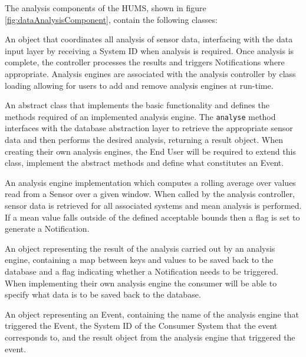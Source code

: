 \documentclass[10pt,a4paper]{article}
\begin{document}
The analysis components of the HUMS, shown in figure
\ref{fig:dataAnalysisComponent}, contain the following classes:

\begin{description}[leftmargin=1cm,labelindent=1cm]
  \item [AnalysisController] An object that coordinates all analysis of
    sensor data, interfacing with the data input layer by
    receiving a System ID when analysis is required. Once analysis is
    complete, the controller processes the results and triggers
    Notifications where appropriate. Analysis engines are associated
    with the analysis controller by class loading allowing for users to
    add and remove analysis engines at run-time.
  \vspace{0.2cm}
  \item [AnalysisEngine] An abstract class that implements the basic
    functionality and defines the methods required of an implemented
    analysis engine. The \texttt{analyse} method interfaces with the database
    abstraction layer to retrieve the appropriate sensor data and then
    performs the desired analysis, returning a result object. When creating 
    their own analysis engines, the End User will be required to extend 
    this class, implement the abstract methods and define what 
    constitutes an Event.
  \vspace{0.2cm}
  \item [MeanAnalysis] An analysis engine implementation which 
    computes a rolling average over values read from a Sensor over
    a given window. When called by the analysis controller, sensor 
    data is retrieved for all associated systems and mean analysis 
    is performed. If a mean value falls outside of the defined acceptable 
    bounds then a flag is set to generate a Notification.
  \vspace{0.2cm}
  \item [Result] An object representing the result of the analysis
    carried out by an analysis engine, containing a
    map between keys and values to be saved back to the database 
    and a flag indicating whether a Notification needs to be triggered.
    When implementing their own analysis engine the consumer will 
    be able to specify what data is to be saved back to the database.
  \vspace{0.2cm}
  \item [Event] An object representing an Event,
    containing the name of the analysis engine that triggered the
    Event, the System ID of the Consumer System that the event corresponds
    to, and the result object from the analysis engine that triggered
    the event.
\end{description}
\end{document}
